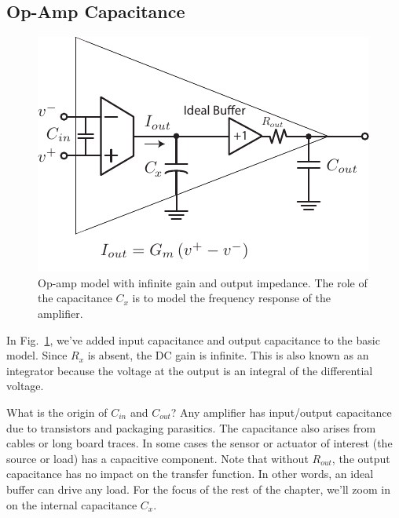 \subsection{Op-Amp Capacitance}
\begin{figure}[tb]
\begin{center}
\includegraphics[scale=1]{opamp_ota_model_cap}
\end{center}
\caption{Op-amp model with infinite gain and output impedance.  The role of the capacitance $C_x$ is to model the frequency response of the amplifier.}
\label{fig:opamp_ota_model_cap}
\end{figure}

In Fig.~\ref{fig:opamp_ota_model_cap}, we've added input capacitance and output capacitance to the basic model.  Since $R_x$ is absent, the DC gain is infinite.  This is also known as an integrator because the voltage at the output is an integral of the differential voltage.    

What is the origin of $C_{in}$ and $C_{out}$?  Any amplifier has input/output capacitance due to transistors and packaging parasitics.  The capacitance also arises from cables or long board traces.  In some cases the sensor or actuator of interest (the source or load) has a capacitive component. Note that without $R_{out}$, the output capacitance has no impact on the transfer function.  In other words, an ideal buffer can drive any load.  For the focus of the rest of the chapter, we'll zoom in on the internal capacitance $C_x$.
